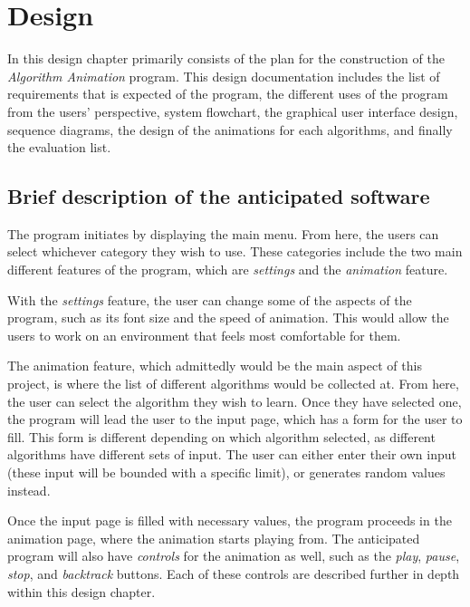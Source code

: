 \chapter{Design}

In this design chapter primarily consists of the plan for the construction of the \textit{Algorithm Animation} program. This design documentation includes the list of requirements that is expected of the program, the different uses of the program from the users' perspective, system flowchart, the graphical user interface design, sequence diagrams, the design of the animations for each algorithms, and finally the evaluation list.

\section{Brief description of the anticipated software}
The program initiates by displaying the main menu. From here, the users can select whichever category they wish to use. These categories include the two main different features of the program, which are \textit{settings} and the \textit{animation} feature.

With the \textit{settings} feature, the user can change some of the aspects of the program, such as its font size and the speed of animation. This would allow the users to work on an environment that feels most comfortable for them.

The animation feature, which admittedly would be the main aspect of this project, is where the list of different algorithms would be collected at. From here, the user can select the algorithm they wish to learn. Once they have selected one, the program will lead the user to the input page, which has a form for the user to fill. This form is different depending on which algorithm selected, as different algorithms have different sets of input. The user can either enter their own input (these input will be bounded with a specific limit), or generates random values instead. 

Once the input page is filled with necessary values, the program proceeds in the animation page, where the animation starts playing from. The anticipated program will also have \textit{controls} for the animation as well, such as the \textit{play}, \textit{pause}, \textit{stop}, and \textit{backtrack} buttons. Each of these controls are described further in depth within this design chapter.

